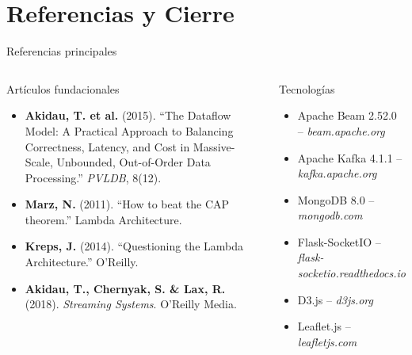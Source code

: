 \documentclass[aspectratio=169, 10pt]{beamer}
\begin{document}
\section{Referencias y Cierre}

\begin{frame}[shrink=10]{Referencias principales}
  \vspace{-2pt}
  \begin{columns}[t]
      \begin{block}{Art\'iculos fundacionales}
        \footnotesize
        \begin{itemize}\setlength\itemsep{3pt}
          \item \textbf{Akidau, T. et al.} (2015).
            ``The Dataflow Model: A Practical Approach to Balancing
            Correctness, Latency, and Cost in Massive-Scale,
            Unbounded, Out-of-Order Data Processing.''
            \textit{PVLDB}, 8(12).
          \item \textbf{Marz, N.} (2011).
            ``How to beat the CAP theorem.''
            Lambda Architecture.
          \item \textbf{Kreps, J.} (2014).
            ``Questioning the Lambda Architecture.''
            O'Reilly.
          \item \textbf{Akidau, T., Chernyak, S. \& Lax, R.}
            (2018). \textit{Streaming Systems}.
            O'Reilly Media.
        \end{itemize}
      \end{block}
      \begin{block}{Tecnolog\'ias}
        \footnotesize
        \begin{itemize}\setlength\itemsep{2pt}
          \item Apache Beam 2.52.0 -- \textit{beam.apache.org}
          \item Apache Kafka 4.1.1 -- \textit{kafka.apache.org}
          \item MongoDB 8.0 -- \textit{mongodb.com}
          \item Flask-SocketIO -- \textit{flask-socketio.readthedocs.io}
          \item D3.js -- \textit{d3js.org}
          \item Leaflet.js -- \textit{leafletjs.com}

\end{itemize}
\end{block}
\end{columns}
\end{frame}
\end{document}
